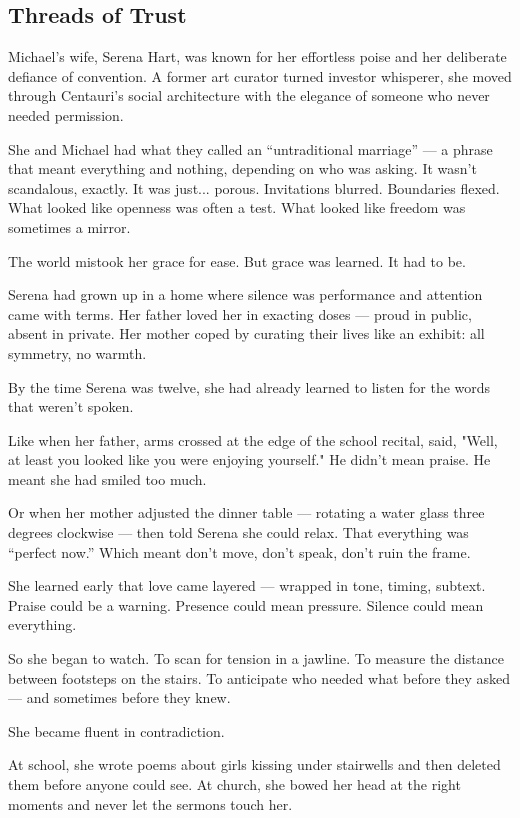 \subsection{Threads of Trust}

Michael’s wife, Serena Hart, was known for her effortless poise and her deliberate defiance of convention.
A former art curator turned investor whisperer, she moved through Centauri’s social architecture with the elegance of someone who never needed permission.

She and Michael had what they called an “untraditional marriage” — a phrase that meant everything and nothing, depending on who was asking.
It wasn’t scandalous, exactly.
It was just... porous.
Invitations blurred. Boundaries flexed.
What looked like openness was often a test. What looked like freedom was sometimes a mirror.

The world mistook her grace for ease.
But grace was learned.
It had to be.

Serena had grown up in a home where silence was performance and attention came with terms.
Her father loved her in exacting doses — proud in public, absent in private.
Her mother coped by curating their lives like an exhibit: all symmetry, no warmth.

By the time Serena was twelve, she had already learned to listen for the words that weren’t spoken.

Like when her father, arms crossed at the edge of the school recital, said,
"Well, at least you looked like you were enjoying yourself."
He didn’t mean praise. He meant she had smiled too much.

Or when her mother adjusted the dinner table — rotating a water glass three degrees clockwise —
then told Serena she could relax. That everything was “perfect now.”
Which meant don’t move, don’t speak, don’t ruin the frame.

She learned early that love came layered — wrapped in tone, timing, subtext.
Praise could be a warning. Presence could mean pressure.
Silence could mean everything.

So she began to watch.
To scan for tension in a jawline.
To measure the distance between footsteps on the stairs.
To anticipate who needed what before they asked — and sometimes before they knew.

She became fluent in contradiction.

At school, she wrote poems about girls kissing under stairwells and then deleted them before anyone could see.
At church, she bowed her head at the right moments and never let the sermons touch her.

